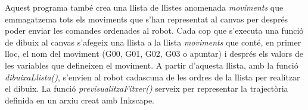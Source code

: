 Aquest programa també crea una llista de llistes anomenada \emph{moviments} que emmagatzema tots els moviments que s'han representat al canvas per després poder enviar les comandes ordenades al robot. Cada cop que s'executa una funció de dibuix al canvas s'afegeix una llista a la llista \emph{moviments} que conté, en primer lloc, el nom del moviment (G00, G01, G02, G03 o apuntar) i després els valors de les variables que defineixen el moviment. A partir d'aquesta llista, amb la funció \emph{dibuixaLlista()}, s'envien al robot cadascuna de les ordres de la llista per realitzar el dibuix. La funció \emph{previsualitzaFitxer()} serveix per representar la trajectòria definida en un arxiu creat amb Inkscape. 


